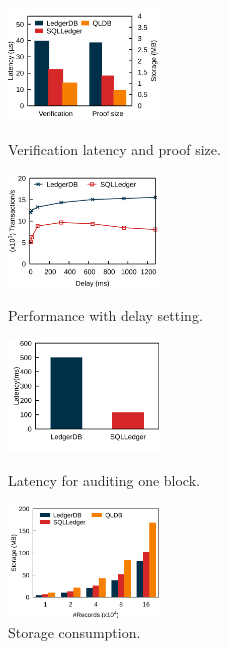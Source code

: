 \documentclass[11pt,dvipdfm]{article}
\begin{document}
\begin{figure}
    \centering
    \begin{minipage}{0.24\textwidth}
        \centering
        \includegraphics[height=3cm]{figs/micro_verification.pdf}
        \caption{Verification latency and proof size.}
        \label{fig:exp:verify}
    \end{minipage}
    \begin{minipage}{0.24\textwidth}
        \centering
        \includegraphics[height=3cm]{figs/micro_delay.pdf}
        \caption{Performance with delay setting.}
        \label{fig:exp:delay}
    \end{minipage}
    \begin{minipage}{0.24\textwidth}
        \centering
        \includegraphics[height=3cm]{figs/micro_audit.pdf}
        \caption{Latency for auditing one block.}
        \label{fig:exp:audit}
    \end{minipage}
    \begin{minipage}{0.24\textwidth}
        \centering
        \includegraphics[height=3cm]{figs/micro_storage.pdf}
        \caption{Storage consumption.}
        \label{fig:exp:storage}
    \end{minipage}
\end{figure}
\end{document}

